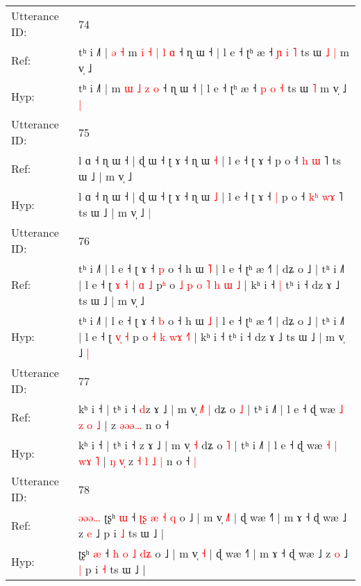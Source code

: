 \documentclass[10pt]{article}
\DeclareRobustCommand{\hl}[1]{{\textcolor{red}{#1}}}
\begin{document}
\begin{longtable}{ll}
 \\
\midrule
Utterance ID: & 74 \\
Ref: & tʰ i ˩˥ |\hl{ }\hl{ə}\hl{ }\hl{˧} m\hl{ }\hl{i} \hl{˧} \hl{|} \hl{l} \hl{ɑ} ˧ ɳ ɯ ˧ | l e ˧ ʈʰ æ ˧ \hl{ɲ} \hl{i} \hl{˥} ts ɯ\hl{ }\hl{˩} \hl{|} m v̩ ˩\hl{}\hl{}
 \\
Hyp: & tʰ i ˩˥ |\hl{}\hl{}\hl{}\hl{} m\hl{}\hl{} \hl{ɯ} \hl{˩} \hl{z} \hl{o} ˧ ɳ ɯ ˧ | l e ˧ ʈʰ æ ˧ \hl{p} \hl{o} \hl{˧} ts ɯ\hl{}\hl{} \hl{˥} m v̩ ˩\hl{ }\hl{|}
 \\
\midrule
Utterance ID: & 75 \\
Ref: & l ɑ ˧ ɳ ɯ ˧ | ɖ ɯ ˧ ʈ ɤ ˧ ɳ ɯ \hl{˧} | l e ˧ ʈ ɤ ˧\hl{}\hl{} p o ˧ \hl{}\hl{h} \hl{}\hl{ɯ} ˥ ts ɯ ˩ | m v̩ ˩\hl{}\hl{}
 \\
Hyp: & l ɑ ˧ ɳ ɯ ˧ | ɖ ɯ ˧ ʈ ɤ ˧ ɳ ɯ \hl{˩} | l e ˧ ʈ ɤ ˧\hl{ }\hl{|} p o ˧ \hl{k}\hl{ʰ} \hl{w}\hl{ɤ} ˥ ts ɯ ˩ | m v̩ ˩\hl{ }\hl{|}
 \\
\midrule
Utterance ID: & 76 \\
Ref: & tʰ i ˩˥ | l e ˧ ʈ ɤ ˧ \hl{p} o ˧ h ɯ \hl{˥} | l e ˧ ʈʰ æ ˧˥ | dʑ o ˩ | tʰ i ˩˥ | l e ˧ ʈ\hl{ }\hl{ɤ}\hl{ }\hl{˧} \hl{|}\hl{ }\hl{ɑ} \hl{˩} p\hl{ʰ} o\hl{ }\hl{˩} \hl{p} \hl{o} \hl{˥}\hl{ }\hl{h} \hl{ɯ}\hl{ }\hl{˩} | kʰ i ˧\hl{ }\hl{|} tʰ i ˧ dz ɤ ˩ ts ɯ ˩ | m v̩ ˩\hl{}\hl{}
 \\
Hyp: & tʰ i ˩˥ | l e ˧ ʈ ɤ ˧ \hl{b} o ˧ h ɯ \hl{˩} | l e ˧ ʈʰ æ ˧˥ | dʑ o ˩ | tʰ i ˩˥ | l e ˧ ʈ\hl{}\hl{}\hl{}\hl{} \hl{}\hl{v}\hl{̩} \hl{˧} p\hl{} o\hl{}\hl{} \hl{˧} \hl{k} \hl{}\hl{w}\hl{ɤ} \hl{}\hl{˧}\hl{˥} | kʰ i ˧\hl{}\hl{} tʰ i ˧ dz ɤ ˩ ts ɯ ˩ | m v̩ ˩\hl{ }\hl{|}
 \\
\midrule
Utterance ID: & 77 \\
Ref: & kʰ i ˧ | tʰ i ˧ \hl{d}z ɤ ˩ | m v̩\hl{ }\hl{˩}\hl{˥} \hl{|} dʑ o \hl{˩} | tʰ i ˩˥ | l e ˧ ɖ wæ \hl{˩} \hl{z} \hl{}\hl{o} \hl{˩} |\hl{}\hl{}\hl{}\hl{}\hl{} z\hl{}\hl{} \hl{}\hl{ə}\hl{ə}\hl{ə}\hl{…} n o ˧\hl{}\hl{}
 \\
Hyp: & kʰ i ˧ | tʰ i ˧ \hl{}z ɤ ˩ | m v̩\hl{}\hl{}\hl{} \hl{˧} dʑ o \hl{˥} | tʰ i ˩˥ | l e ˧ ɖ wæ \hl{˧} \hl{|} \hl{w}\hl{ɤ} \hl{˥} |\hl{ }\hl{ŋ}\hl{ }\hl{v}\hl{̩} z\hl{ }\hl{˧} \hl{l}\hl{ }\hl{˩}\hl{ }\hl{|} n o ˧\hl{ }\hl{|}
 \\
\midrule
Utterance ID: & 78 \\
Ref: & \hl{ə}\hl{ə}\hl{ə}\hl{…}\hl{ }ʈʂʰ \hl{ɯ} ˧ \hl{ʈ}\hl{ʂ} \hl{æ} \hl{˧} \hl{}\hl{q} o ˩ | m v̩ \hl{˩}\hl{˥} | ɖ wæ ˧˥ | m ɤ ˧ ɖ wæ ˩ z \hl{e} ˩\hl{}\hl{} p i \hl{˩} ts ɯ ˩ |
 \\
Hyp: & \hl{}\hl{}\hl{}\hl{}\hl{}ʈʂʰ \hl{æ} ˧ \hl{}\hl{h} \hl{o} \hl{˩} \hl{d}\hl{ʑ} o ˩ | m v̩ \hl{}\hl{˧} | ɖ wæ ˧˥ | m ɤ ˧ ɖ wæ ˩ z \hl{o} ˩\hl{ }\hl{|} p i \hl{˧} ts ɯ ˩ |

\end{longtable}
\end{document}
